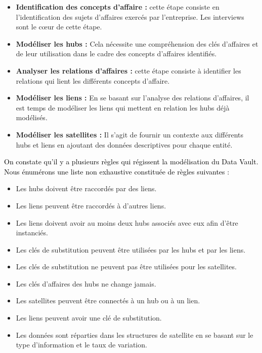 \documentclass[a4paper,12pt]{report}
\begin{document}
\begin{itemize}

\item	\textbf{Identification des concepts d’affaire :} cette étape consiste en l’identification des sujets d’affaires exercés par l’entreprise. Les interviews sont le cœur de cette étape.

\item	\textbf{Modéliser les hubs :} Cela nécessite une compréhension des clés d’affaires et de leur utilisation dans le cadre des concepts d’affaires identifiés.

\item	\textbf{Analyser les relations d’affaires :} cette étape consiste à identifier les relations qui lient les différents concepts d’affaire.

\item	\textbf{Modéliser les liens :} En se basant sur l’analyse des relations d’affaires, il est temps de modéliser les liens qui mettent en relation les hubs déjà modélisés. 


\item	\textbf{Modéliser les satellites :} Il s’agit de fournir un contexte aux différents hubs et liens en ajoutant des données descriptives pour chaque entité.

\end{itemize}

\textcolor{black}{On constate qu’il y a plusieurs règles qui régissent la modélisation du Data Vault. Nous énumérons une liste non exhaustive constituée de règles  suivantes\citep{3} :}

\begin{itemize}

\item	Les hubs doivent être raccordés par des liens.

\item	Les liens peuvent être raccordés à d’autres liens.

\item	Les liens doivent avoir au moins deux hubs associés avec eux afin d'être instanciés.

\item	Les clés de substitution peuvent être utilisées par les hubs et par les liens.

\item	Les clés de substitution ne peuvent pas être utilisées pour les satellites.

\item	Les clés d’affaires des hubs ne change jamais.

\item	Les satellites peuvent être connectés à un hub ou à un lien.

\item	Les liens peuvent avoir une clé de substitution.

\item	Les données sont réparties dans les structures de satellite en se basant sur le type d'information et le taux de variation.

\end{itemize}
\end{document}
